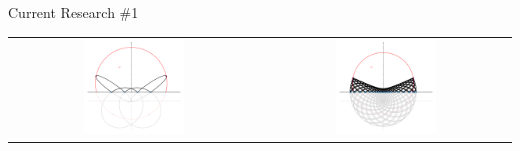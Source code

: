 \documentclass[compress,aspectratio=169,10pt,usenames,dvipsnames]{beamer}
\begin{document}
\begin{frame}

\begin{block}{Current Research \#1}
\end{block}
\begin{center}
\begin{tabular}{c c}
\includegraphics[width=0.42\textwidth]{Period4a} & \includegraphics[width=0.42\textwidth]{QuasiPeriodic}   
\end{tabular}

\end{center}

\end{frame}

\end{document}

